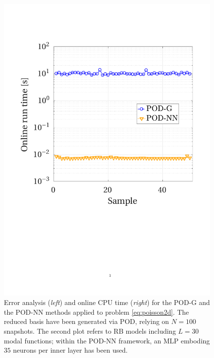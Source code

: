 \documentclass{elsarticle}
\numberwithin{equation}{section}
\theoremstyle{theorem}
\theoremstyle{definition}
\theoremstyle{remark}
\theoremstyle{proposition}
\numberwithin{figure}{section}
\begin{document}
\begin{figure}[t!]
			\includegraphics[scale = 0.38, trim = {1.5cm 8.95cm 1.5cm 3.8cm}, clip]{poisson2d_3_time}
			
			\vspace*{-0.1cm}
			
			\caption{Error analysis (\emph{left}) and online CPU time (\emph{right}) for the POD-G and the POD-NN methods applied to problem \eqref{eq:poisson2d}. The reduced basis have been generated via POD, relying on $N = 100$ snapshots. The second plot refers to RB models including $L = 30$ modal functions; within the POD-NN framework, an MLP emboding $35$ neurons per inner layer has been used.}
			\label{fig:poisson2d-fig3}
			
			\vspace*{0.2cm}
			

\end{figure}
\end{document}

